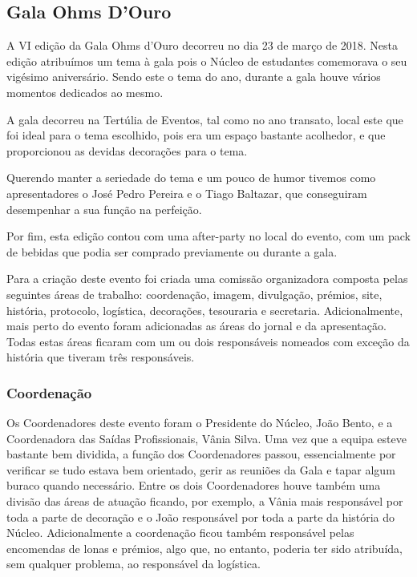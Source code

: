 
\subsection{Gala Ohms D'Ouro}

A VI edição da Gala Ohms d’Ouro decorreu no dia 23 de março de 2018. Nesta edição atribuímos um tema à gala pois o Núcleo de estudantes comemorava o seu vigésimo aniversário. Sendo este o tema do ano, durante a gala houve vários momentos dedicados ao mesmo. 

A gala decorreu na Tertúlia de Eventos, tal como no ano transato, local este que foi ideal para o tema escolhido, pois era um espaço bastante acolhedor, e que proporcionou as devidas decorações para o tema. 

Querendo manter a seriedade do tema e um pouco de humor tivemos como apresentadores o José Pedro Pereira e o Tiago Baltazar, que conseguiram desempenhar a sua função na perfeição. 

Por fim, esta edição contou com uma after-party no local do evento, com um pack de bebidas que podia ser comprado previamente ou durante a gala.

Para a criação deste evento foi criada uma comissão organizadora composta pelas seguintes áreas de trabalho: coordenação, imagem, divulgação, prémios, site, história, protocolo, logística, decorações, tesouraria e secretaria. Adicionalmente, mais perto do evento foram adicionadas as áreas do jornal e da apresentação. Todas estas áreas ficaram com um ou dois responsáveis nomeados com exceção da história que tiveram três responsáveis.

\subsubsection{Coordenação}
Os Coordenadores deste evento foram o Presidente do Núcleo, João Bento, e a Coordenadora das Saídas Profissionais, Vânia Silva. Uma vez que a equipa esteve bastante bem dividida, a função dos Coordenadores passou, essencialmente por verificar se tudo estava bem orientado, gerir as reuniões da Gala e tapar algum buraco quando necessário. Entre os dois Coordenadores houve também uma divisão das áreas de atuação ficando, por exemplo, a Vânia mais responsável por toda a parte de decoração e o João responsável por toda a parte da história do Núcleo. Adicionalmente a coordenação ficou também responsável pelas encomendas de lonas e prémios, algo que, no entanto, poderia ter sido atribuída, sem qualquer problema, ao responsável da logística.


